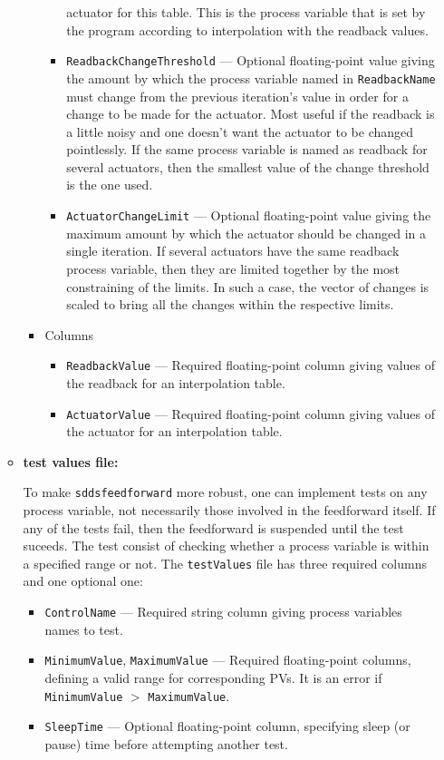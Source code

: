 \begin{itemize}
\begin{itemize}
\begin{itemize}
\begin{itemize}
        actuator for this table.  This is the process variable that is set by
        the program according to interpolation with the readback values.
\item {\tt ReadbackChangeThreshold} --- Optional floating-point value giving
        the amount by which the process variable named in {\tt ReadbackName}
        must change from the previous iteration's value in order for a
        change to be made for the actuator.  Most useful if the readback is
        a little noisy and one doesn't want the actuator to be changed
        pointlessly.  If the same process variable is named as readback for
        several actuators, then the smallest value of the change threshold
        is the one used.
\item {\tt ActuatorChangeLimit} --- Optional floating-point value giving 
        the maximum amount by which the actuator should be changed in a
        single iteration.  If several actuators have the same
        readback process variable, then they are limited together by the
        most constraining of the limits.  In such a case, the vector of
        changes is scaled to bring all the changes within the respective
        limits.
\end{itemize}
\item Columns
\begin{itemize}
\item {\tt ReadbackValue} --- Required floating-point column giving values
        of the readback for an interpolation table.
\item {\tt ActuatorValue} --- Required floating-point column giving values
        of the actuator for an interpolation table.
\end{itemize}
\end{itemize}

\item {\bf test values file:} \par
To make \verb+sddsfeedforward+ more robust, one can implement tests on any process variable,
not necessarily those involved in the feedforward itself. If any of the tests fail, then the 
feedforward is suspended until the test suceeds. The test consist of checking whether a process 
variable is within a specified range or not. The \verb+testValues+ file has three required columns and
one optional one:
\begin{itemize}
        \item {\tt ControlName} --- Required string column giving process variables names to test.
        \item {\tt MinimumValue}, {\tt MaximumValue} --- Required floating-point columns, defining
                a valid range for corresponding PVs.  It is an error if
                {\tt MinimumValue} $>$ {\tt MaximumValue}.
        \item {\tt SleepTime} --- Optional floating-point column, specifying sleep (or pause) time before
                attempting another test.
\end{itemize}
\end{itemize}


\end{itemize}
